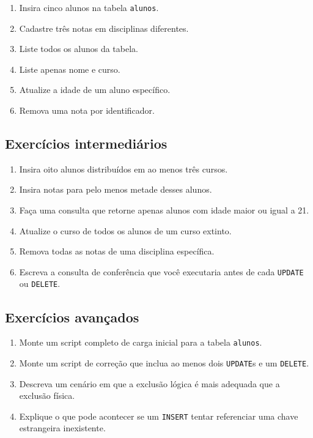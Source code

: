 \begin{enumerate}
    \item Insira cinco alunos na tabela \texttt{alunos}.
    \item Cadastre três notas em disciplinas diferentes.
    \item Liste todos os alunos da tabela.
    \item Liste apenas nome e curso.
    \item Atualize a idade de um aluno específico.
    \item Remova uma nota por identificador.
\end{enumerate}

\subsection{Exercícios intermediários}

\begin{enumerate}
    \item Insira oito alunos distribuídos em ao menos três cursos.
    \item Insira notas para pelo menos metade desses alunos.
    \item Faça uma consulta que retorne apenas alunos com idade maior ou igual a 21.
    \item Atualize o curso de todos os alunos de um curso extinto.
    \item Remova todas as notas de uma disciplina específica.
    \item Escreva a consulta de conferência que você executaria antes de cada \texttt{UPDATE} ou \texttt{DELETE}.
\end{enumerate}

\subsection{Exercícios avançados}

\begin{enumerate}
    \item Monte um script completo de carga inicial para a tabela \texttt{alunos}.
    \item Monte um script de correção que inclua ao menos dois \texttt{UPDATE}s e um \texttt{DELETE}.
    \item Descreva um cenário em que a exclusão lógica é mais adequada que a exclusão física.
    \item Explique o que pode acontecer se um \texttt{INSERT} tentar referenciar uma chave estrangeira inexistente.
\end{enumerate}


